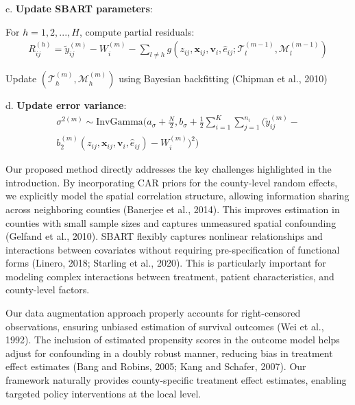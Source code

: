 \documentclass[useAMS,referee]{biom}
\begin{document}
\begin{enumerate}
   c. \textbf{Update SBART parameters}:
   
      For $h = 1, 2, ..., H$, compute partial residuals:
      \begin{equation}
      \begin{split}
      R_{ij}^{(h)} = \tilde{y}_{ij}^{(m)} - W_i^{(m)} - \sum_{l \neq h} g(z_{ij}, \mathbf{x}_{ij}, \mathbf{v}_i, \hat{e}_{ij}; \mathcal{T}_l^{(m-1)}, \mathcal{M}_l^{(m-1)})
      \end{split}
      \end{equation}
      
      Update $(\mathcal{T}_h^{(m)}, \mathcal{M}_h^{(m)})$ using Bayesian backfitting (Chipman et al., 2010)
   
   d. \textbf{Update error variance}:
      \begin{equation}
      \begin{split}
      \sigma^{2(m)} \sim \text{InvGamma}\biggl(a_\sigma + \frac{N}{2}, b_\sigma + \frac{1}{2}\sum_{i=1}^K\sum_{j=1}^{n_i}(\tilde{y}_{ij}^{(m)} - \\
      b_2^{(m)}(z_{ij}, \mathbf{x}_{ij}, \mathbf{v}_i, \hat{e}_{ij}) - W_i^{(m)})^2\biggr)
      \end{split}
      \end{equation}
\end{enumerate}


Our proposed method directly addresses the key challenges highlighted in the introduction. By incorporating CAR priors for the county-level random effects, we explicitly model the spatial correlation structure, allowing information sharing across neighboring counties (Banerjee et al., 2014). This improves estimation in counties with small sample sizes and captures unmeasured spatial confounding (Gelfand et al., 2010). SBART flexibly captures nonlinear relationships and interactions between covariates without requiring pre-specification of functional forms (Linero, 2018; Starling et al., 2020). This is particularly important for modeling complex interactions between treatment, patient characteristics, and county-level factors.

Our data augmentation approach properly accounts for right-censored observations, ensuring unbiased estimation of survival outcomes (Wei et al., 1992). The inclusion of estimated propensity scores in the outcome model helps adjust for confounding in a doubly robust manner, reducing bias in treatment effect estimates (Bang and Robins, 2005; Kang and Schafer, 2007). Our framework naturally provides county-specific treatment effect estimates, enabling targeted policy interventions at the local level.
\end{document}
